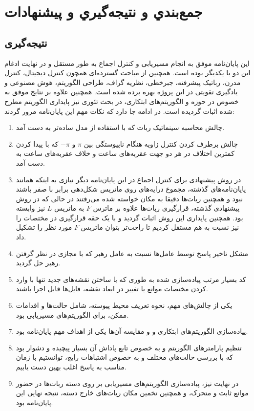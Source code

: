 \chapter{جمع‌بندي و نتيجه‌گيري و پیشنهادات}
\section{نتیجه‌گیری}
این پایان‌نامه موفق به انجام مسیریابی و کنترل اجماع به طور مستقل و در نهایت ادغام این دو با یکدیگر بوده است. همچنین از مباحث گسترده‌ای همچون کنترل دیجیتال، کنترل مدرن، رباتیک پیشرفته، جبرخطی، نظریه گراف، طراحی الگوریتم، هوش مصنوعی و یادگیری تقویتی در این پروژه بهره برده شده است. همچنین علاوه بر نتایج موفق به خصوص در حوزه  و الگوریتم‌های ابتکاری، در بحث تئوری نیز پایداری الگوریتم مطرح شده اثبات گردیده است. در ادامه جا دارد که نکات مهم این پایان‌نامه مرور گردند:
\begin{enumerate}
	\item چالش محاسبه سینماتیک ربات که با استفاده از مدل ساده‌تر به دست آمد.
	\item چالش برطرف کردن کنترل زاویه هنگام ناپیوستگی بین $\pi$ و $-\pi$ که با پیدا کردن کمترین اختلاف در هر دو جهت عقربه‌های ساعت و خلاف عقربه‌های ساعت به دست آمد.
	\item در روش پیشنهادی برای کنترل اجماع در این پایان‌نامه دیگر نیازی به اینکه همانند پایان‌نامه‌های گذشته، مجموع درایه‌های روی ماتریس شکل‌دهی برابر با صفر باشند نبود و همچنین ربات‌ها دقیقا به مکان خواسته شده می‌رفتند در حالی که در روش پیشنهادی گذشته، قرارگیری ربات‌ها علاوه بر ماترس $F$ به ماتریس $L$ نیز وابسته بود. همچنین پایداری این روش اثبات گردید و با یک حقه قرارگیری در مختصات  را نیز نسبت به هم مستقل کردیم تا راحت‌تر بتوان ماتریس $F$ مورد نظر را تشکیل داد.
	\item مشکل تاخیر پاسخ توسط عامل‌ها نسبت به عامل رهبر که با مجازی در نظر گرفتن رهبر حل گردید.
	\item کد بسیار مرتب پیاده‌سازی شده به طوری که با ساختن نقشه‌های جدید تنها با وارد کردن مختصات موانع یا تغییر در ابعاد نقشه، فایل‌ها قابل اجرا باشند.
	\item یکی از چالش‌های مهم، نحوه تعریف محیط پیوسته، شامل حالت‌ها و اقدامات ممکن، برای الگوریتم‌های مسیریابی بود.
	\item پیاده‌سازی الگوریتم‌های ابتکاری و  و مقایسه آن‌ها یکی از اهداف مهم پایان‌نامه بود.
	\item تنظیم پارامتر‌های الگوریتم  و به خصوص تابع پاداش آن بسیار پیچیده و دشوار بود که با بررسی حالت‌های مختلف و به خصوص اشتباهات رایج، توانستیم با زمان مناسب به پاسخ اغلب بهین دست یابیم.
	\item در نهایت نیز، پیاده‌سازی الگوریتم‌های مسیریابی بر روی دسته ربات‌ها در حضور موانع ثابت و متحرک، و همچنین تخمین مکان ربات‌های خارج دسته، نتیجه نهایی این پایان‌نامه بود.

\end{enumerate}
